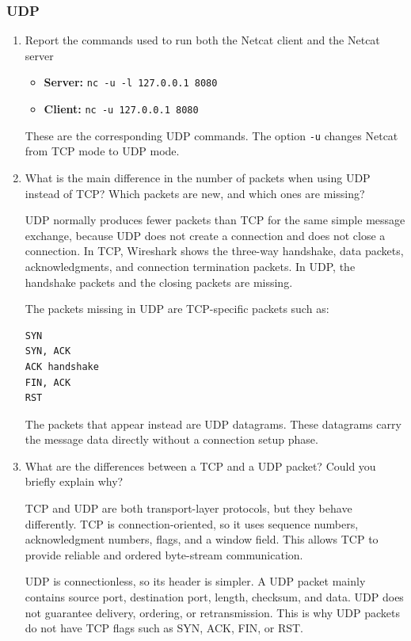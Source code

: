 \documentclass{article}
\begin{document}
\subsubsection{UDP}

\begin{enumerate}
    \item Report the commands used to run both the Netcat client and the Netcat server
    \begin{itemize}
        \item \textbf{Server:} \texttt{nc -u -l 127.0.0.1 8080}
        \item \textbf{Client:} \texttt{nc -u 127.0.0.1 8080}
    \end{itemize}

    These are the corresponding UDP commands. The option \texttt{-u} changes Netcat from TCP mode to UDP mode.

    \item What is the main difference in the number of packets when using UDP instead of TCP? Which packets are new, and which ones are missing?

    UDP normally produces fewer packets than TCP for the same simple message exchange, because UDP does not create a connection and does not close a connection. In TCP, Wireshark shows the three-way handshake, data packets, acknowledgments, and connection termination packets. In UDP, the handshake packets and the closing packets are missing.

    The packets missing in UDP are TCP-specific packets such as:
    \begin{verbatim}
SYN
SYN, ACK
ACK handshake
FIN, ACK
RST
    \end{verbatim}

    The packets that appear instead are UDP datagrams. These datagrams carry the message data directly without a connection setup phase.

    \item What are the differences between a TCP and a UDP packet? Could you briefly explain why?

    TCP and UDP are both transport-layer protocols, but they behave differently. TCP is connection-oriented, so it uses sequence numbers, acknowledgment numbers, flags, and a window field. This allows TCP to provide reliable and ordered byte-stream communication.

    UDP is connectionless, so its header is simpler. A UDP packet mainly contains source port, destination port, length, checksum, and data. UDP does not guarantee delivery, ordering, or retransmission. This is why UDP packets do not have TCP flags such as SYN, ACK, FIN, or RST.


\end{enumerate}
\end{document}
